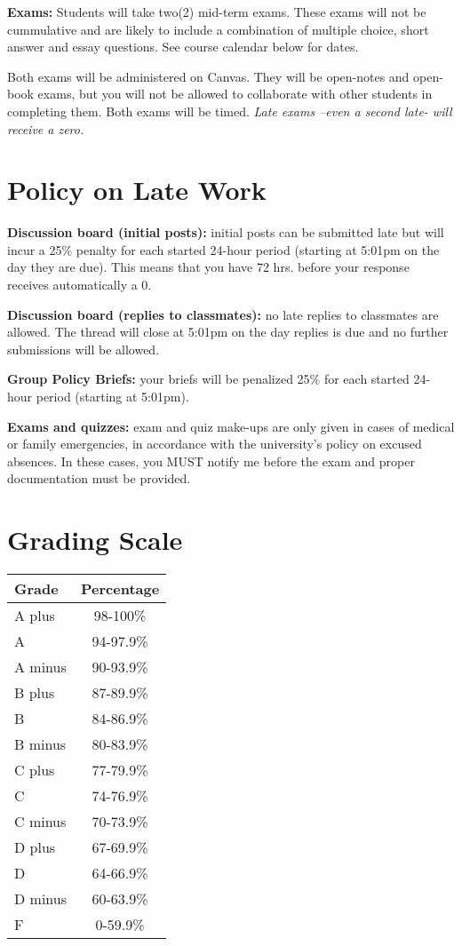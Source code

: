 \documentclass[11pt,]{article}
\begin{document}
\textbf{Exams:} Students will take two(2) mid-term exams. These exams
will not be cummulative and are likely to include a combination of
multiple choice, short answer and essay questions. See course calendar
below for dates.

Both exams will be administered on Canvas. They will be open-notes and
open-book exams, but you will not be allowed to collaborate with other
students in completing them. Both exams will be timed. \emph{Late exams
--even a second late- will receive a zero.}

\hypertarget{policy-on-late-work}{%
\section{Policy on Late Work}\label{policy-on-late-work}}

\textbf{Discussion board (initial posts):} initial posts can be
submitted late but will incur a 25\% penalty for each started 24-hour
period (starting at 5:01pm on the day they are due). This means that you
have 72 hrs. before your response receives automatically a 0.

\textbf{Discussion board (replies to classmates):} no late replies to
classmates are allowed. The thread will close at 5:01pm on the day
replies is due and no further submissions will be allowed.

\textbf{Group Policy Briefs:} your briefs will be penalized 25\% for
each started 24-hour period (starting at 5:01pm).

\textbf{Exams and quizzes:} exam and quiz make-ups are only given in
cases of medical or family emergencies, in accordance with the
university's policy on excused absences. In these cases, you MUST notify
me before the exam and proper documentation must be provided.

\hypertarget{grading-scale}{%
\section{Grading Scale}\label{grading-scale}}

\begin{longtable}[]{@{}lc@{}}
\toprule()
Grade & Percentage \\
\midrule()
\endhead
A plus & 98-100\% \\
A & 94-97.9\% \\
A minus & 90-93.9\% \\
B plus & 87-89.9\% \\
B & 84-86.9\% \\
B minus & 80-83.9\% \\
C plus & 77-79.9\% \\
C & 74-76.9\% \\
C minus & 70-73.9\% \\
D plus & 67-69.9\% \\
D & 64-66.9\% \\
D minus & 60-63.9\% \\
F & 0-59.9\% \\
\bottomrule()
\end{longtable}
\end{document}
